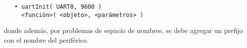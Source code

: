 \begin{verbatim}
   • uartInit( UART0, 9600 )
     <función>( <objeto>, <parámetros> )
\end{verbatim}

donde además, por problemas de espacio de nombres, se debe agregar un prefijo con el nombre del periférico.














